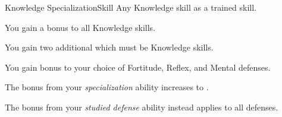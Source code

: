    \begin{feat}{Knowledge Specialization}{Skill}
        \featpre Any Knowledge skill as a trained skill.

         You gain a  bonus to all Knowledge skills.

         You gain two additional  which must be Knowledge skills.

         You gain  bonus to your choice of Fortitude, Reflex, and Mental defenses. 

         The bonus from your \textit{specialization} ability increases to .

         The bonus from your \textit{studied defense} ability instead applies to all defenses.
    \end{feat}


